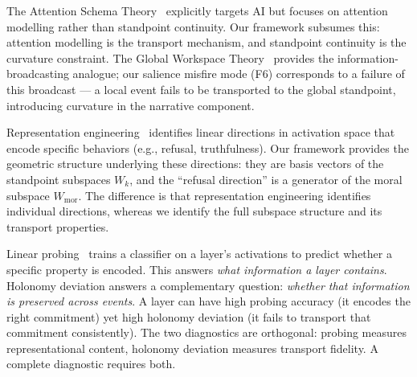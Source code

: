 The Attention Schema Theory~\cite{graziano2017attention} explicitly targets AI
but focuses on attention modelling rather than standpoint continuity. Our
framework subsumes this: attention modelling is the transport mechanism, and
standpoint continuity is the curvature constraint. The Global Workspace
Theory~\cite{baars1988cognitive, dehaene2011experimental} provides the
information-broadcasting analogue; our salience misfire mode (F6) corresponds
to a failure of this broadcast --- a local event fails to be transported to the
global standpoint, introducing curvature in the narrative component.

Representation engineering~\cite{zou2023representation} identifies linear
directions in activation space that encode specific behaviors (e.g., refusal,
truthfulness). Our framework provides the geometric structure underlying these
directions: they are basis vectors of the standpoint subspaces $W_k$, and the
``refusal direction'' is a generator of the moral subspace $W_{\mathrm{mor}}$.
The difference is that representation engineering identifies individual
directions, whereas we identify the full subspace structure and its transport
properties.

Linear probing~\cite{belinkov2021probing} trains a classifier on a layer's
activations to predict whether a specific property is encoded. This answers
\emph{what information a layer contains}. Holonomy deviation answers a
complementary question: \emph{whether that information is preserved across
events}. A layer can have high probing accuracy (it encodes the right
commitment) yet high holonomy deviation (it fails to transport that commitment
consistently). The two diagnostics are orthogonal: probing measures
representational content, holonomy deviation measures transport fidelity. A
complete diagnostic requires both.
